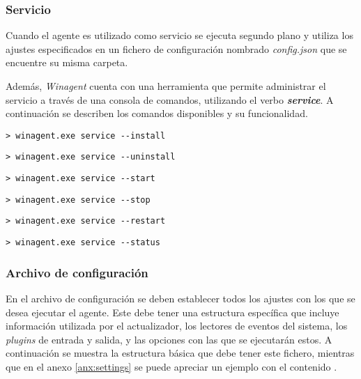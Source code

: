         \subsubsection{Servicio}
        
            Cuando el agente es utilizado como servicio se ejecuta segundo plano y utiliza los ajustes especificados en un fichero de configuración nombrado \textit{config.json} que se encuentre su misma carpeta.
            
            Además, \textit{Winagent} cuenta con una herramienta que permite administrar el servicio a través de una consola de comandos, utilizando el verbo \textbf{\textit{service}}. A continuación se describen los comandos disponibles y su funcionalidad.
            
            \begin{lstlisting}[style=batch, caption=Instalar el servicio]
                > winagent.exe service --install
            \end{lstlisting}
            
            \begin{lstlisting}[style=batch, caption=Desinstalar el servicio]
                > winagent.exe service --uninstall
            \end{lstlisting}
            
            \begin{lstlisting}[style=batch, caption=Iniciar el service]
                > winagent.exe service --start
            \end{lstlisting}
            
            \begin{lstlisting}[style=batch, caption=Detener el servicio]
                > winagent.exe service --stop
            \end{lstlisting}
            
            \begin{lstlisting}[style=batch, caption=Reiniciar el servicio]
                > winagent.exe service --restart
            \end{lstlisting}
            
            \begin{lstlisting}[style=batch, caption=Comprobar el estado del servicio]
                > winagent.exe service --status
            \end{lstlisting}
            
        \subsubsection{Archivo de configuración}
            En el archivo de configuración se deben establecer todos los ajustes con los que se desea ejecutar el agente. Este debe tener una estructura específica que incluye información utilizada por el actualizador, los lectores de eventos del sistema, los \textit{plugins} de entrada y salida, y las opciones con las que se ejecutarán estos. A continuación se muestra la estructura básica que debe tener este fichero, mientras que en el anexo \ref{anx:settings} se puede apreciar un ejemplo con el contenido .
            

